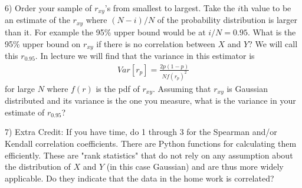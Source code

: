 \documentclass[11pt]{beamer}
\begin{document}
\begin{frame}
6) Order your sample of $r_{xy}$'s from smallest to largest.  Take the $i$th value to be an estimate of the $r_{xy}$ where $(N-i)/N$ of the probability distribution is larger than it.  For example the 95\% upper bound would be at $i/N = 0.95$.  What is the 95\% upper bound on $r_{xy}$ if there is no correlation between $X$ and $Y$?  We will call this $r_{0.95}$.
In lecture we will find that the variance in this estimator is
\begin{align}
Var[r_p] = \frac{2 p (1-p) }{N f(r_p)^2 }
\end{align}
for large $N$ where $f(r)$ is the pdf of $r_{xy}$. 
Assuming that $r_{xy}$ is Gaussian distributed and its variance is the one you measure, what is the variance in your estimate of $r_{0.95}$?
\end{frame}
\begin{frame}
7) Extra Credit: If you have time, do 1 through 3 for the Spearman and/or Kendall correlation coefficients.  There are Python functions for calculating them efficiently.  These are "rank statistics" that do not rely on any  assumption about the distribution of $X$ and $Y$ (in this case Gaussian) and are thus more widely applicable.  Do they indicate that the data in the home work is correlated?
\end{frame}
\end{document}
